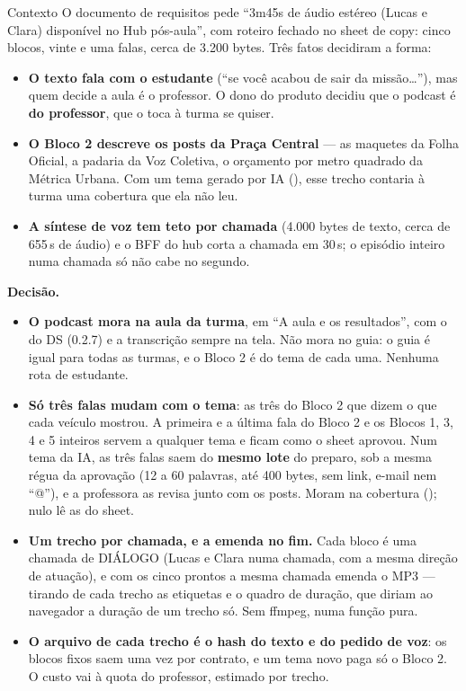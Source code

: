 \begin{especificacao}{Contexto}
O documento de requisitos pede \enquote{3m45s de áudio estéreo (Lucas e Clara)
disponível no Hub pós-aula}, com roteiro fechado no sheet de copy: cinco blocos,
vinte e uma falas, cerca de 3.200 bytes. Três fatos decidiram a forma:

\begin{itemize}
  \item \textbf{O texto fala com o estudante} (\enquote{se você acabou de sair da
    missão\ldots}), mas quem decide a aula é o professor. O dono do produto
    decidiu que o podcast é \textbf{do professor}, que o toca à turma se quiser.
  \item \textbf{O Bloco 2 descreve os posts da Praça Central} --- as maquetes da
    Folha Oficial, a padaria da Voz Coletiva, o orçamento por metro quadrado da
    Métrica Urbana. Com um tema gerado por IA (), esse trecho
    contaria à turma uma cobertura que ela não leu.
  \item \textbf{A síntese de voz tem teto por chamada} (4.000 bytes de texto,
    cerca de 655\,s de áudio) e o BFF do hub corta a chamada em 30\,s; o episódio
    inteiro numa chamada só não cabe no segundo.
\end{itemize}
\end{especificacao}

\textbf{Decisão.}

\begin{itemize}
  \item \textbf{O podcast mora na aula da turma}, em \enquote{A aula e os
    resultados}, com o  do DS (0.2.7) e a transcrição sempre na
    tela. Não mora no guia: o guia é igual para todas as turmas, e o Bloco 2 é do
    tema de cada uma. Nenhuma rota de estudante.
  \item \textbf{Só três falas mudam com o tema}: as três do Bloco 2 que dizem o
    que cada veículo mostrou. A primeira e a última fala do Bloco 2 e os Blocos
    1, 3, 4 e 5 inteiros servem a qualquer tema e ficam como o sheet aprovou.
    Num tema da IA, as três falas saem do \textbf{mesmo lote} do preparo, sob a
    mesma régua da aprovação (12 a 60 palavras, até 400 bytes, sem link, e-mail
    nem \enquote{@}), e a professora as revisa junto com os posts. Moram na
    cobertura (); nulo lê as do sheet.
  \item \textbf{Um trecho por chamada, e a emenda no fim.} Cada bloco é uma
    chamada de DIÁLOGO (Lucas e Clara numa chamada, com a mesma direção de
    atuação), e com os cinco prontos a mesma chamada emenda o MP3 --- tirando de
    cada trecho as etiquetas e o quadro de duração, que diriam ao navegador a
    duração de um trecho só. Sem ffmpeg, numa função pura.
  \item \textbf{O arquivo de cada trecho é o hash do texto e do pedido de voz}:
    os blocos fixos saem uma vez por contrato, e um tema novo paga só o Bloco 2.
    O custo vai à quota do professor, estimado por trecho.
\end{itemize}

